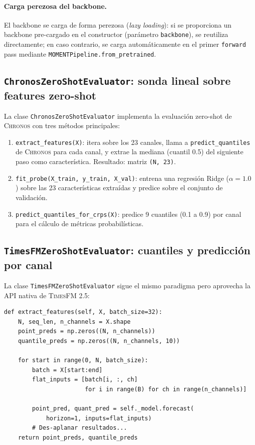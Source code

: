 \documentclass[12pt, a4paper]{article}
\newcommand{\code}[1]{\texttt{#1}}
\newcommand{\chronos}{\textsc{Chronos}}
\newcommand{\timesfm}{\textsc{TimesFM}}
\begin{document}
\paragraph{Carga perezosa del backbone.} El backbone se carga de forma perezosa (\textit{lazy loading}): si se proporciona un backbone pre-cargado en el constructor (parámetro \code{backbone}), se reutiliza directamente; en caso contrario, se carga automáticamente en el primer \code{forward} pass mediante \code{MOMENTPipeline.from\_pretrained}.


\subsection{\code{ChronosZeroShotEvaluator}: sonda lineal sobre features zero-shot}

La clase \code{ChronosZeroShotEvaluator} implementa la evaluación zero-shot de \chronos{} con tres métodos principales:

\begin{enumerate}
    \item \code{extract\_features(X)}: itera sobre los 23 canales, llama a \code{predict\_quantiles} de \chronos{} para cada canal, y extrae la mediana (cuantil 0.5) del siguiente paso como característica. Resultado: matriz \code{(N, 23)}.
    \item \code{fit\_probe(X\_train, y\_train, X\_val)}: entrena una regresión Ridge ($\alpha=1.0$) sobre las 23 características extraídas y predice sobre el conjunto de validación.
    \item \code{predict\_quantiles\_for\_crps(X)}: predice 9 cuantiles (0.1 a 0.9) por canal para el cálculo de métricas probabilísticas.
\end{enumerate}


\subsection{\code{TimesFMZeroShotEvaluator}: cuantiles y predicción por canal}

La clase \code{TimesFMZeroShotEvaluator} sigue el mismo paradigma pero aprovecha la API nativa de \timesfm{} 2.5:

\begin{lstlisting}[caption={Extracción de características con TimesFM (simplificado).}, label={lst:timesfm_extract}]
def extract_features(self, X, batch_size=32):
    N, seq_len, n_channels = X.shape
    point_preds = np.zeros((N, n_channels))
    quantile_preds = np.zeros((N, n_channels, 10))

    for start in range(0, N, batch_size):
        batch = X[start:end]
        flat_inputs = [batch[i, :, ch]
                       for i in range(B) for ch in range(n_channels)]

        point_pred, quant_pred = self._model.forecast(
            horizon=1, inputs=flat_inputs)
        # Des-aplanar resultados...
    return point_preds, quantile_preds
\end{lstlisting}
\end{document}
